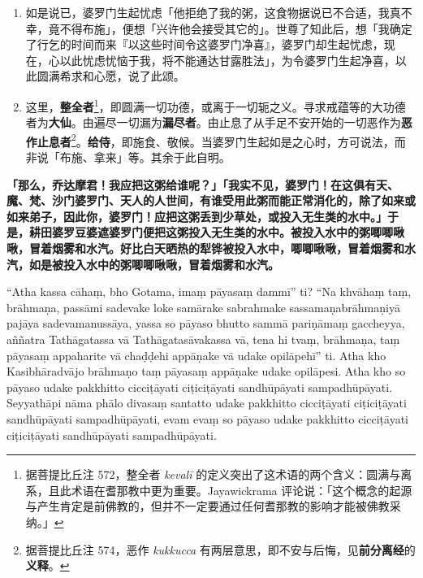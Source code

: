 \begin{enumerate}\item 如是说已，婆罗门生起忧虑「他拒绝了我的粥，这食物据说已不合适，我真不幸，竟不得布施」，便想「兴许他会接受其它的」。世尊了知此后，想「我确定了行乞的时间而来『以这些时间令这婆罗门净喜』，婆罗门却生起忧虑，现在，心以此忧虑忧恼于我，将不能通达甘露胜法」，为令婆罗门生起净喜，以此圆满希求和心愿，说了此颂。
\item 这里，\textbf{整全者}\footnote{据菩提比丘注 572，整全者 \textit{kevalī} 的定义突出了这术语的两个含义：圆满与离系，且此术语在耆那教中更为重要。Jayawickrama 评论说：「这个概念的起源与产生肯定是前佛教的，但并不一定要通过任何耆那教的影响才能被佛教采纳。」}，即圆满一切功德，或离于一切轭之义。寻求戒蕴等的大功德者为\textbf{大仙}。由遍尽一切漏为\textbf{漏尽者}。由止息了从手足不安开始的一切恶作为\textbf{恶作止息者}\footnote{据菩提比丘注 574，恶作 \textit{kukkucca} 有两层意思，即不安与后悔，见\textbf{前分离经}的\textbf{义释}。}。\textbf{给侍}，即施食、敬候。当婆罗门生起如是之心时，方可说法，而非说「布施、拿来」等。其余于此自明。\end{enumerate}

\textbf{「那么，乔达摩君！我应把这粥给谁呢？」「我实不见，婆罗门！在这俱有天、魔、梵、沙门婆罗门、天人的人世间，有谁受用此粥而能正常消化的，除了如来或如来弟子，因此你，婆罗门！应把这粥丢到少草处，或投入无生类的水中。」于是，耕田婆罗豆婆遮婆罗门便把这粥投入无生类的水中。被投入水中的粥唧唧啾啾，冒着烟雾和水汽。好比白天晒热的犁铧被投入水中，唧唧啾啾，冒着烟雾和水汽，如是被投入水中的粥唧唧啾啾，冒着烟雾和水汽。}

“Atha kassa cāhaṃ, bho Gotama, imaṃ pāyasaṃ dammī” ti? “Na khvāhaṃ taṃ, brāhmaṇa, passāmi sadevake loke samārake sabrahmake sassamaṇabrāhmaṇiyā pajāya sadevamanussāya, yassa so pāyaso bhutto sammā pariṇāmaṃ gaccheyya, aññatra Tathāgatassa vā Tathāgatasāvakassa vā, tena hi tvaṃ, brāhmaṇa, taṃ pāyasaṃ appaharite vā chaḍḍehi appāṇake vā udake opilāpehī” ti. Atha kho Kasibhāradvājo brāhmaṇo taṃ pāyasaṃ appāṇake udake opilāpesi. Atha kho so pāyaso udake pakkhitto cicciṭāyati ciṭiciṭāyati sandhūpāyati sampadhūpāyati. Seyyathāpi nāma phālo divasaṃ santatto udake pakkhitto cicciṭāyati ciṭiciṭāyati sandhūpāyati sampadhūpāyati, evam evaṃ so pāyaso udake pakkhitto cicciṭāyati ciṭiciṭāyati sandhūpāyati sampadhūpāyati.

